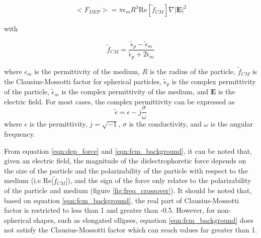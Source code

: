  \begin{equation}
     \big< F_{DEP} \big> = \pi \epsilon_m R^3 \text{Re}[\tilde{f}_{CM}] \nabla |\textbf{E}|^2 
     \label{eqn:dep_force}
 \end{equation}
 
 \noindent with
 
 \begin{equation}
     \tilde{f}_{CM} = \frac{\tilde{\epsilon}_p - \tilde{\epsilon}_m}{\tilde{\epsilon}_p + 2\tilde{\epsilon}_m} 
     \label{eqn:fcm_background}
 \end{equation}
 
 \noindent where $\epsilon_m$ is the permittivity of the medium, $R$ is the radius of the particle, $\tilde{f}_{CM}$ is the Clausius-Mossotti factor for spherical particles,  $\tilde{\epsilon}_p$ is the complex permittivity of the particle, $\tilde{\epsilon}_m$ is the complex permittivity of the medium, and $\textbf{E}$ is the electric field. For most cases, the complex permittivity can be expressed as 
 \begin{equation}
     \tilde{\epsilon} = \epsilon - j\frac{\sigma}{\omega}
 \end{equation}
\noindent where $\epsilon$ is the permittivity, $j = \sqrt{-1}$, $\sigma$ is the conductivity, and $\omega$ is the angular frequency. 

\par From equation \ref{eqn:dep_force} and \ref{eqn:fcm_background}, it can be noted that, given an electric field, the magnitude of the dielectrophoretic force depends on the size of the particle and the polarizability of the particle with respect to the medium (i.e Re$\big[\tilde{f}_{CM}\big]$), and the sign of the force only relates to the polarizability of the particle and medium (figure \ref{fig:freq_crossover}). It should be noted that, based on equation \ref{eqn:fcm_background}, the real part of Clausius-Mossotti factor is restricted to less than 1 and greater than -0.5. However, for non-spherical shapes, such as elongated ellipses, equation \ref{eqn:fcm_background} does not satisfy the Clausius-Mossotti factor which can reach values far greater than 1.  


